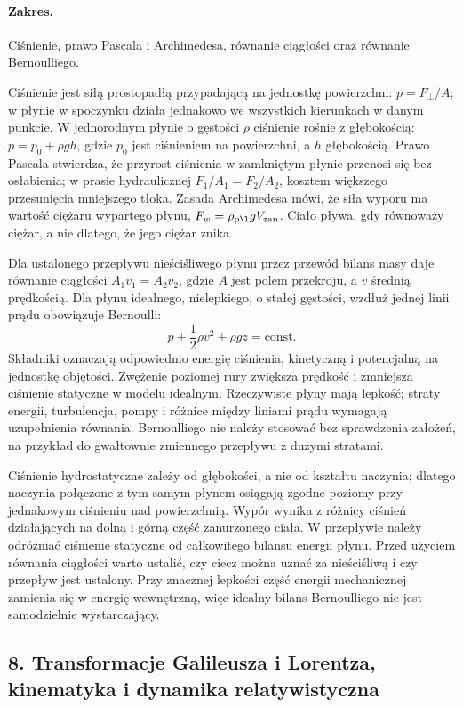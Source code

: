 \documentclass[11pt,a4paper]{article}
\begin{document}
\paragraph{Zakres.} Ciśnienie, prawo Pascala i Archimedesa, równanie ciągłości oraz równanie Bernoulliego.

Ciśnienie jest siłą prostopadłą przypadającą na jednostkę powierzchni: $p=F_\perp/A$; w płynie w spoczynku działa jednakowo we wszystkich kierunkach w danym punkcie. W jednorodnym płynie o gęstości $\rho$ ciśnienie rośnie z głębokością: $p=p_0+\rho gh$, gdzie $p_0$ jest ciśnieniem na powierzchni, a $h$ głębokością. Prawo Pascala stwierdza, że przyrost ciśnienia w zamkniętym płynie przenosi się bez osłabienia; w prasie hydraulicznej $F_1/A_1=F_2/A_2$, kosztem większego przesunięcia mniejszego tłoka. Zasada Archimedesa mówi, że siła wyporu ma wartość ciężaru wypartego płynu, $F_w=\rho_{\rm pł}gV_{\rm zan}$. Ciało pływa, gdy równoważy ciężar, a nie dlatego, że jego ciężar znika.

Dla ustalonego przepływu nieściśliwego płynu przez przewód bilans masy daje równanie ciągłości $A_1v_1=A_2v_2$, gdzie $A$ jest polem przekroju, a $v$ średnią prędkością. Dla płynu idealnego, nielepkiego, o stałej gęstości, wzdłuż jednej linii prądu obowiązuje Bernoulli:
\[
p+\frac12\rho v^2+\rho gz=\text{const}.
\]
Składniki oznaczają odpowiednio energię ciśnienia, kinetyczną i potencjalną na jednostkę objętości. Zwężenie poziomej rury zwiększa prędkość i zmniejsza ciśnienie statyczne w modelu idealnym. Rzeczywiste płyny mają lepkość; straty energii, turbulencja, pompy i różnice między liniami prądu wymagają uzupełnienia równania. Bernoulliego nie należy stosować bez sprawdzenia założeń, na przykład do gwałtownie zmiennego przepływu z dużymi stratami.

Ciśnienie hydrostatyczne zależy od głębokości, a nie od kształtu naczynia; dlatego naczynia połączone z tym samym płynem osiągają zgodne poziomy przy jednakowym ciśnieniu nad powierzchnią. Wypór wynika z różnicy ciśnień działających na dolną i górną część zanurzonego ciała. W przepływie należy odróżniać ciśnienie statyczne od całkowitego bilansu energii płynu. Przed użyciem równania ciągłości warto ustalić, czy ciecz można uznać za nieściśliwą i czy przepływ jest ustalony. Przy znacznej lepkości część energii mechanicznej zamienia się w energię wewnętrzną, więc idealny bilans Bernoulliego nie jest samodzielnie wystarczający.

\subsection{8. Transformacje Galileusza i Lorentza, kinematyka i dynamika relatywistyczna}
\end{document}
